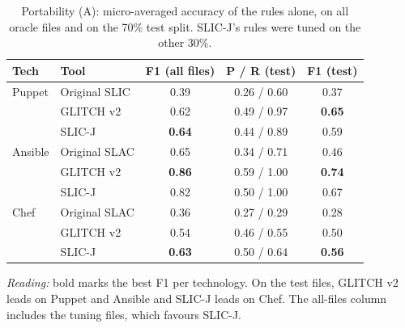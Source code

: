 \begin{table}[t]\centering\caption{Portability (A): micro-averaged accuracy of the rules alone, on all oracle files and on the 70\% test split. SLIC-J's rules were tuned on the other 30\%.}\label{tab:split}
\scriptsize\setlength{\tabcolsep}{3pt}\begin{tabular}{llccc}\toprule
Tech & Tool & F1 (all files) & P / R (test) & F1 (test) \\ \midrule
Puppet & Original SLIC & 0.39 & 0.26 / 0.60 & 0.37 \\
 & GLITCH v2 & 0.62 & 0.49 / 0.97 & \textbf{0.65} \\
 & SLIC-J & \textbf{0.64} & 0.44 / 0.89 & 0.59 \\
\midrule
Ansible & Original SLAC & 0.65 & 0.34 / 0.71 & 0.46 \\
 & GLITCH v2 & \textbf{0.86} & 0.59 / 1.00 & \textbf{0.74} \\
 & SLIC-J & 0.82 & 0.50 / 1.00 & 0.67 \\
\midrule
Chef & Original SLAC & 0.36 & 0.27 / 0.29 & 0.28 \\
 & GLITCH v2 & 0.54 & 0.46 / 0.55 & 0.50 \\
 & SLIC-J & \textbf{0.63} & 0.50 / 0.64 & \textbf{0.56} \\
\bottomrule\end{tabular}
\par\vspace{3pt}\parbox{\linewidth}{\footnotesize\emph{Reading:} bold marks the best F1 per technology. On the test files, GLITCH v2 leads on Puppet and Ansible and SLIC-J leads on Chef. The all-files column includes the tuning files, which favours SLIC-J.}
\end{table}